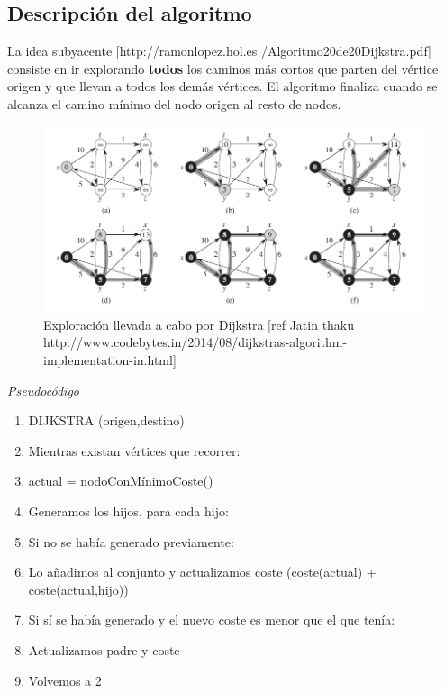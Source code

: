 \documentclass[conference]{IEEEtran}
\begin{document}
{\subsection{Descripción del algoritmo}

La idea subyacente  [http://ramonlopez.hol.es
/Algoritmo20de20Dijkstra.pdf] consiste en ir explorando \textbf{todos} los caminos más cortos que parten del vértice origen y que llevan a todos los demás vértices. El algoritmo finaliza cuando se alcanza el camino mínimo del nodo origen al resto de nodos.

\begin{figure}[H]
\centerline{\includegraphics[scale=0.325]{IMAGENES/dijkstra.png}}
\caption{Exploración llevada a cabo por Dijkstra [ref Jatin thaku http://www.codebytes.in/2014/08/dijkstras-algorithm-implementation-in.html]}
\label{fig}
\end{figure}

\begin{center}
\textit{Pseudocódigo}
\end{center}

\begin{enumerate}
\item DIJKSTRA (origen,destino)
\item \hspace{0.5cm} Mientras existan vértices que recorrer:
\item \hspace{1cm} actual = nodoConMínimoCoste()
\item \hspace{1cm} Generamos los hijos, para cada hijo:
\item \hspace{1.15cm} Si no se había generado previamente:
\item \hspace{1.25cm} Lo añadimos al conjunto y actualizamos coste (coste(actual) + coste(actual,hijo))
\item \hspace{1.15cm} Si sí se había generado y el nuevo coste es menor que el que tenía:
\item \hspace{1.25cm} Actualizamos padre y coste
\item \hspace{1cm} Volvemos a 2
\end{enumerate}


}
\end{document}
